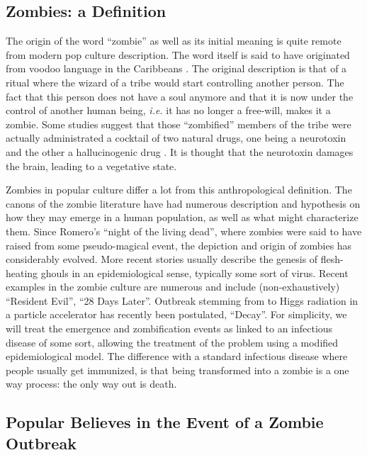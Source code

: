 \documentclass[11pt]{article} %
\begin{document}
\subsection{Zombies: a Definition}\indent

The origin of the word ``zombie'' as well as its initial meaning is quite remote from modern pop culture description. The word itself is said to have originated from voodoo language in the Caribbeans \cite{munz2009zombies}. The original description is that of a ritual where the wizard of a tribe would start controlling another person. The fact that this person does not have a soul anymore and that it is now under the control of another human being, \textit{i.e.} it has no longer a free-will, makes it a zombie. Some studies suggest that those ``zombified'' members of the tribe were actually administrated a cocktail of two natural drugs, one being a neurotoxin and the other a hallucinogenic drug \cite{littlewood1997clinical}. It is thought that the neurotoxin damages the brain, leading to a vegetative state.



Zombies in popular culture differ a lot from this anthropological definition. The canons of the zombie literature have had numerous description and hypothesis on how they may emerge in a human population, as well as what might characterize them. Since Romero's ``night of the living dead'', where zombies were said to have raised from some pseudo-magical event, the depiction and origin of zombies has considerably evolved. More recent stories usually describe the genesis of flesh-heating ghouls in an epidemiological sense, typically some sort of virus. Recent examples in the zombie culture are numerous and include (non-exhaustively) ``Resident Evil'', ``28 Days Later''. Outbreak stemming from to Higgs radiation in a particle accelerator has recently been postulated, ``Decay''. For simplicity, we will treat the emergence and zombification events as linked to an infectious disease of some sort, allowing the treatment of the problem using a modified epidemiological model. The difference with a standard infectious disease where people usually get immunized, is that being transformed into a zombie is a one way process: the only way out is death.


\subsection{Popular Believes in the Event of a Zombie Outbreak}\indent
\end{document}
